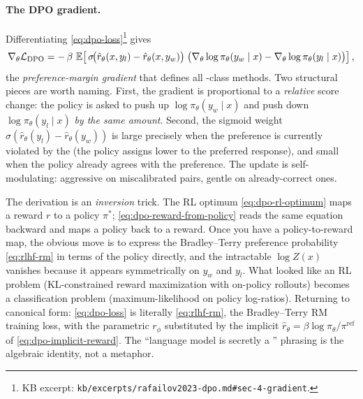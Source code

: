 \paragraph{The DPO gradient.} Differentiating
\cref{eq:dpo-loss}\footnote{KB excerpt:
\nolinkurl{kb/excerpts/rafailov2023-dpo.md#sec-4-gradient}.} gives
\citep[\S 4]{rafailov2023-dpo}
\begin{equation}
\nabla_\theta \mathcal{L}_{\mathrm{DPO}}
  = -\, \beta\, \operatorname{\mathbb{E}}\!\left[\,
       \sigma\!\big(\hat{r}_\theta(x, y_l) - \hat{r}_\theta(x, y_w)\big)
       \;\big(\nabla_\theta \log \pi_\theta(y_w \mid x)
              - \nabla_\theta \log \pi_\theta(y_l \mid x)\big)
     \right],
\label{eq:dpo-gradient}
\end{equation}
the \emph{preference-margin gradient} that defines all -class
methods. Two structural pieces are worth naming. First, the gradient is
proportional to a \emph{relative} score change: the policy is asked to
push up $\log \pi_\theta(y_w \mid x)$ and push down
$\log \pi_\theta(y_l \mid x)$ \emph{by the same amount}. Second, the
sigmoid weight $\sigma(\hat r_\theta(y_l) - \hat r_\theta(y_w))$ is
large precisely when the preference is currently violated by the
 (the policy assigns lower  to the
preferred response), and small when the policy already agrees with the
preference. The update is self-modulating: aggressive on
miscalibrated pairs, gentle on already-correct ones.

\begin{intuition}
The  derivation is an \emph{inversion} trick. The RL optimum
\cref{eq:dpo-rl-optimum} maps a reward $r$ to a policy $\pi^*$;
\cref{eq:dpo-reward-from-policy} reads the same equation backward and
maps a policy back to a reward. Once you have a policy-to-reward map,
the obvious move is to express the Bradley--Terry preference
probability \cref{eq:rlhf-rm} in terms of the policy directly, and the
intractable $\log Z(x)$ vanishes because it appears symmetrically on
$y_w$ and $y_l$. What looked like an RL problem (KL-constrained reward
maximization with on-policy rollouts) becomes a classification problem
(maximum-likelihood on policy log-ratios). Returning to canonical form:
\cref{eq:dpo-loss} is literally \cref{eq:rlhf-rm}, the
Bradley--Terry RM training loss, with the parametric $r_\phi$
substituted by the implicit $\hat r_\theta = \beta \log \pi_\theta /
\pi^{\mathrm{ref}}$ of \cref{eq:dpo-implicit-reward}. The ``language
model is secretly a '' phrasing
\citep{rafailov2023-dpo} is the algebraic identity, not a metaphor.
\end{intuition}

